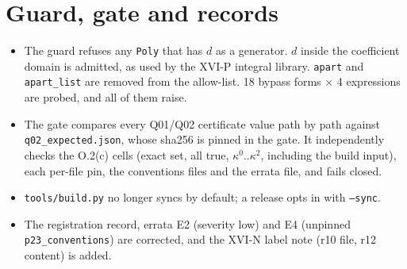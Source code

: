 \section{Guard, gate and records}
\begin{itemize}
\item The guard refuses any \texttt{Poly} that has $d$ as a generator. $d$ inside the coefficient domain is admitted, as
used by the XVI-P integral library. \texttt{apart} and \texttt{apart\_list} are removed from the allow-list. 18 bypass
forms $\times$ 4 expressions are probed, and all of them raise.
\item The gate compares every Q01/Q02 certificate value path by path against \texttt{q02\_expected.json}, whose sha256 is
pinned in the gate. It independently checks the O.2(c) cells (exact set, all true, $\kappa^0$..$\kappa^2$, including the
build input), each per-file pin, the conventions files and the errata file, and fails closed.
\item \texttt{tools/build.py} no longer syncs by default; a release opts in with \texttt{--sync}.
\item The registration record, errata E2 (severity low) and E4 (unpinned \texttt{p23\_conventions}) are corrected, and
the XVI-N label note (r10 file, r12 content) is added.
\end{itemize}
